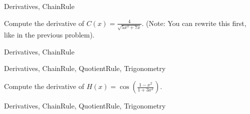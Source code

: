 

	
\begin{tagblock}{Derivatives, ChainRule}
\begin{question}
	

Compute the derivative of $\displaystyle C(x) = \frac{4}{\sqrt{5x^3+7x}}$.  (Note: You can rewrite this first, like in the previous problem). 


	
\begin{tags}
	    Derivatives, ChainRule
\end{tags}
	
\begin{diary}
\end{diary}
	
\begin{solution}
	   
\end{solution}
	
\end{question}

\end{tagblock}



	
\begin{tagblock}{Derivatives, ChainRule, QuotientRule, Trigonometry}
\begin{question}
	

Compute the derivative of $\displaystyle H(x) =  \cos \left( \frac{1-x^2}{1+3x^2} \right)$.


	
\begin{tags}
	    Derivatives, ChainRule, QuotientRule, Trigonometry
\end{tags}
	
\begin{diary}
\end{diary}
	
\begin{solution}
	   
\end{solution}
	
\end{question}

\end{tagblock}

